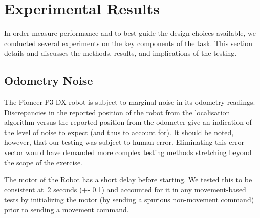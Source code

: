 \documentclass{article}
\begin{document}
    \section{Experimental Results}
	In order measure performance and to best guide the design choices available, we conducted several experiments on the key components of the task. This section details and discusses the methods, results, and implications of the testing.

	\subsection{Odometry Noise}
	The Pioneer P3-DX robot is subject to marginal noise in its odometry readings. Discrepancies in the reported position of the robot from the localisation algorithm versus the reported position from the odometer give an indication of the level of noise to expect (and thus to account for). It should be noted, however, that our testing was subject to human error. Eliminating this error vector would have demanded more complex testing methods stretching beyond the scope of the exercise.

The motor of the Robot has a short delay before starting. We tested this to be consistent at~2 seconds (+- 0.1) and accounted for it in any movement-based tests by initializing the motor (by sending a spurious non-movement command) prior to sending a movement command.
\end{document}
